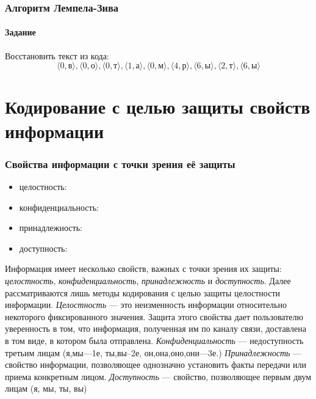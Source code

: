 \begin{frame}
    \frametitle{Алгоритм Лемпела-Зива}
    \framesubtitle{Задание}
    
    Восстановить текст из кода:
    \[
        \langle 0,\text{в}\rangle,
        \langle 0,\text{о}\rangle,
        \langle 0,\text{т}\rangle,
        \langle 1,\text{а}\rangle,
        \langle 0,\text{м}\rangle,
        \langle 4,\text{р}\rangle,
        \langle 6,\text{ы}\rangle,
        \langle 2,\text{т}\rangle,
        \langle 6,\text{ы}\rangle    
    \]
\end{frame}


\section{Кодирование с целью защиты свойств информации}


\begin{frame}
    \frametitle{Свойства информации с точки зрения её защиты}
    
    \begin{itemize}
        \item целостность: 
        \item конфиденциальность: 
        \item принадлежность: 
        \item доступность: 
    \end{itemize}
\end{frame}

Информация имеет несколько свойств, важных с точки зрения их защиты: \emph{целостность}, \emph{конфиденциальность}, \emph{принадлежность} и \emph{доступность}. Далее рассматриваются лишь методы кодирования с целью защиты целостности информации. \emph{Целостность} --- это неизменность информации относительно некоторого фиксированного значения. Защита этого свойства дает пользователю уверенность в том, что информация, полученная им по каналу связи, доставлена в том виде, в котором была отправлена. \emph{Конфиденциальность} --- недоступность третьим лицам (я,мы---1е, ты,вы--2е, он,она,оно,они---3е.) \emph{Принадлежность} --- свойство информации, позволяющее однозначно установить факты передачи или приема конкретным лицом. \emph{Доступность} --- свойство, позволяющее первым двум лицам (я, мы, ты, вы)


